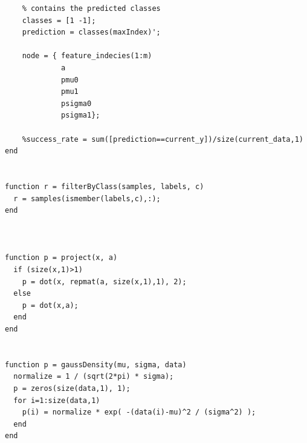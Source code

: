 \documentclass{article}
\begin{document}
\begin{lstlisting}
    % contains the predicted classes
    classes = [1 -1];
    prediction = classes(maxIndex)';
    
    node = { feature_indecies(1:m)
             a
             pmu0
             pmu1
             psigma0
             psigma1};
    
    %success_rate = sum([prediction==current_y])/size(current_data,1)
end


function r = filterByClass(samples, labels, c)
  r = samples(ismember(labels,c),:);
end



function p = project(x, a)
  if (size(x,1)>1)
    p = dot(x, repmat(a, size(x,1),1), 2);
  else
    p = dot(x,a);
  end
end


function p = gaussDensity(mu, sigma, data)
  normalize = 1 / (sqrt(2*pi) * sigma);
  p = zeros(size(data,1), 1);
  for i=1:size(data,1)
    p(i) = normalize * exp( -(data(i)-mu)^2 / (sigma^2) );
  end
end
\end{lstlisting}
\end{document}
